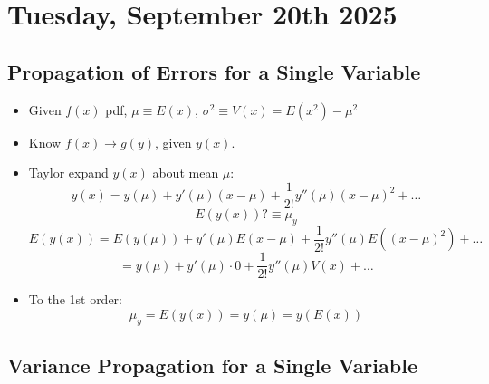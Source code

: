 \section{Tuesday, September 20th 2025}

\subsection{Propagation of Errors for a Single Variable}

\begin{itemize}
      \item Given $f(x)$ pdf, $\mu \equiv E(x)$, $\sigma^2 \equiv V(x) = E(x^2) - \mu^2$
      \item Know $f(x) \rightarrow g(y)$, given $y(x)$.
      \item Taylor expand $y(x)$ about mean $\mu$:
            \[ y(x) = y(\mu) + y'(\mu) (x - \mu) + \frac{1}{2!} y''(\mu) (x - \mu)^2 + \ldots \]
            \[ E(y(x)) ? \equiv \mu_y \]
            \[ E(y(x)) = E(y(\mu)) + y'(\mu) E(x - \mu) + \frac{1}{2!} y''(\mu) E((x - \mu)^2) + \ldots \]
            \[ = y(\mu) + y'(\mu) \cdot 0 + \frac{1}{2!} y''(\mu) V(x)+ \ldots \]

      \item To the 1st order:
            \[ \mu_y = E(y(x)) = y(\mu) = y(E(x)) \]
\end{itemize}

\subsection{Variance Propagation for a Single Variable}

